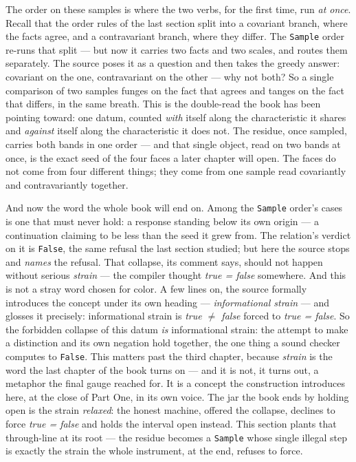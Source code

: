 The order on these samples is where the two verbs, for the first time, run \emph{at once}. Recall that the order rules
of the last section split into a covariant branch, where the facts agree, and a contravariant branch, where they
differ. The \verb|Sample| order re-runs that split --- but now it carries two facts and two scales, and routes them
separately. The source poses it as a question and then takes the greedy answer: covariant on the one, contravariant on
the other --- why not both? So a single comparison of two samples funges on the fact that agrees and tanges on the fact
that differs, in the same breath. This is the double-read the book has been pointing toward: one datum, counted
\emph{with} itself along the characteristic it shares and \emph{against} itself along the characteristic it does not.
The residue, once sampled, carries both bands in one order --- and that single object, read on two bands at once, is the
exact seed of the four faces a later chapter will open. The faces do not come from four different things; they come from
one sample read covariantly and contravariantly together.

And now the word the whole book will end on. Among the \verb|Sample| order's cases is one that must never hold: a
response standing below its own origin --- a continuation claiming to be less than the seed it grew from. The relation's
verdict on it is \verb|False|, the same refusal the last section studied; but here the source stops and \emph{names} the
refusal. That collapse, its comment says, should not happen without serious \emph{strain} --- the compiler thought
\emph{true = false} somewhere. And this is not a stray word chosen for color. A few lines on, the source formally
introduces the concept under its own heading --- \emph{informational strain} --- and glosses it precisely: informational
strain is \emph{true \(\neq\) false} forced to \emph{true = false}. So the forbidden collapse of this datum \emph{is}
informational strain: the attempt to make a distinction and its own negation hold together, the one thing a sound
checker computes to \verb|False|. This matters past the third chapter, because \emph{strain} is the word the last
chapter of the book turns on --- and it is not, it turns out, a metaphor the final gauge reached for. It is a concept the
construction introduces here, at the close of Part One, in its own voice. The jar the book ends by holding open is the
strain \emph{relaxed}: the honest machine, offered the collapse, declines to force \emph{true = false} and holds the
interval open instead. This section plants that through-line at its root --- the residue becomes a \verb|Sample| whose
single illegal step is exactly the strain the whole instrument, at the end, refuses to force.

